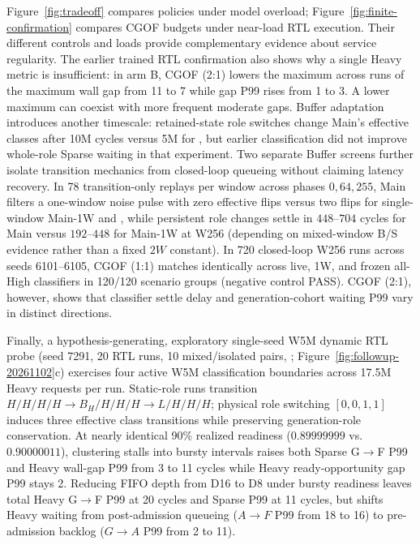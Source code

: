 Figure~\ref{fig:tradeoff} compares policies under model overload; Figure~\ref{fig:finite-confirmation} compares CGOF budgets under near-load RTL execution. Their different controls and loads provide complementary evidence about service regularity. The earlier trained RTL confirmation also shows why a single Heavy metric is insufficient: in arm B, CGOF (2:1) lowers the maximum across runs of the maximum wall gap from 11 to 7 while gap P99 rises from 1 to 3. A lower maximum can coexist with more frequent moderate gaps. Buffer adaptation introduces another timescale: retained-state role switches change Main's effective classes after 10M cycles versus 5M for \Alg, but earlier classification did not improve whole-role Sparse waiting in that experiment. Two separate  Buffer screens further isolate transition mechanics from closed-loop queueing without claiming latency recovery. In 78 transition-only replays per window across phases $0,64,255$, Main filters a one-window noise pulse with zero effective flips versus two flips for single-window Main-1W and \Alg, while persistent role changes settle in $448\text{--}704$ cycles for Main versus $192\text{--}448$ for Main-1W at W256 (depending on mixed-window B/S evidence rather than a fixed $2W$ constant). In 720 closed-loop W256 runs across seeds 6101--6105, CGOF (1:1) matches identically across live, 1W, and frozen all-High classifiers in 120/120 scenario groups (negative control PASS). CGOF (2:1), however, shows that classifier settle delay and generation-cohort waiting P99 vary in distinct directions.

Finally, a hypothesis-generating, exploratory single-seed W5M dynamic RTL probe (seed 7291, 20 RTL runs, 10 mixed/isolated pairs, ; Figure~\ref{fig:followup-20261102}c) exercises four active W5M classification boundaries across 17.5M Heavy requests per run. Static-role runs transition $H/H/H/H\rightarrow B_H/H/H/H\rightarrow L/H/H/H$; physical role switching $[0,0,1,1]$ induces three effective class transitions while preserving generation-role conservation. At nearly identical 90\% realized readiness ($0.89999999$ vs.\ $0.90000011$), clustering stalls into bursty intervals raises both Sparse G$\rightarrow$F P99 and Heavy wall-gap P99 from 3 to 11 cycles while Heavy ready-opportunity gap P99 stays 2. Reducing FIFO depth from D16 to D8 under bursty readiness leaves total Heavy G$\rightarrow$F P99 at 20 cycles and Sparse P99 at 11 cycles, but shifts Heavy waiting from post-admission queueing ($A\rightarrow F$ P99 from 18 to 16) to pre-admission backlog ($G\rightarrow A$ P99 from 2 to 11).

